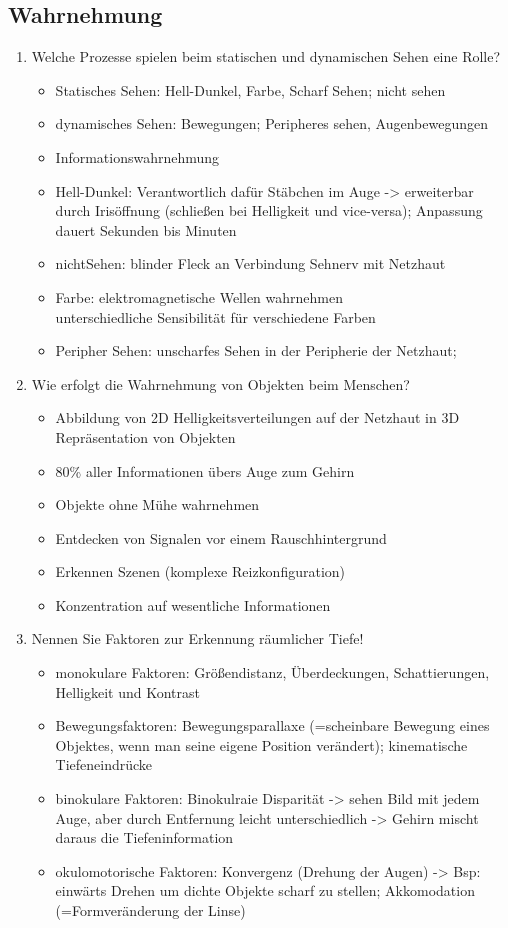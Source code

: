 \subsection{Wahrnehmung}
\begin{enumerate}
	\item Welche Prozesse spielen beim statischen und dynamischen Sehen eine Rolle?
	\begin{itemize}
		\item Statisches Sehen: Hell-Dunkel, Farbe, Scharf Sehen; nicht sehen
		\item dynamisches Sehen: Bewegungen; Peripheres sehen, Augenbewegungen
		\item Informationswahrnehmung
		\item Hell-Dunkel: Verantwortlich dafür Stäbchen im Auge -> erweiterbar durch Irisöffnung (schließen bei Helligkeit und vice-versa); Anpassung dauert Sekunden bis Minuten
		\item nichtSehen: blinder Fleck an Verbindung Sehnerv mit Netzhaut
		\item Farbe: elektromagnetische Wellen wahrnehmen\\
		unterschiedliche Sensibilität für verschiedene Farben
		\item Peripher Sehen: unscharfes Sehen in der Peripherie der Netzhaut; 
	\end{itemize}
	
	\item Wie erfolgt die Wahrnehmung von Objekten beim Menschen?
	\begin{itemize}
		\item Abbildung von 2D Helligkeitsverteilungen auf der Netzhaut in 3D Repräsentation von Objekten
		\item 80\% aller Informationen übers Auge zum Gehirn
		\item Objekte ohne Mühe wahrnehmen
		\item Entdecken von Signalen vor einem Rauschhintergrund
		\item Erkennen Szenen (komplexe Reizkonfiguration)
		\item Konzentration auf wesentliche Informationen
	\end{itemize}
	\item Nennen Sie Faktoren zur Erkennung räumlicher Tiefe!
	\begin{itemize}
		\item monokulare Faktoren: Größendistanz, Überdeckungen, Schattierungen, Helligkeit und Kontrast
		\item Bewegungsfaktoren: Bewegungsparallaxe (=scheinbare Bewegung eines Objektes, wenn man seine eigene Position verändert); kinematische Tiefeneindrücke
		\item binokulare Faktoren: Binokulraie Disparität -> sehen Bild mit jedem Auge, aber durch Entfernung leicht unterschiedlich -> Gehirn mischt daraus die Tiefeninformation
		\item okulomotorische Faktoren: Konvergenz (Drehung der Augen) -> Bsp: einwärts Drehen um dichte Objekte scharf zu stellen; Akkomodation (=Formveränderung der Linse)
	\end{itemize}
	

\end{enumerate}
